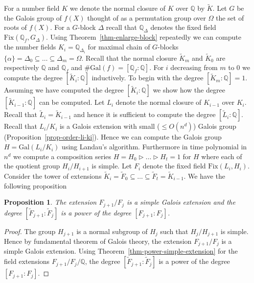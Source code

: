 \documentclass[11pt]{madras}%
\newtheorem{proposition}[theorem]{Proposition}
\theoremstyle{remark}
\newcommand{\Gal}[1]{{\ensuremath{\mathrm{Gal}\left(#1\right)}}}
\newcommand{\Fix}[2]{{\ensuremath{\mathrm{Fix}\left(#1,#2\right)}}}
\begin{document}
For a number field $K$ we denote the normal closure of $K$ over
$\mathbb{Q}$ by $\tilde{K}$. Let $G$ be the Galois group of $f(X)$
thought of as a permutation group over $\Omega$ the set of roots of
$f(X)$.  For a $G$-block $\Delta$ recall that $\mathbb{Q}_\Delta$
denotes the fixed field $\Fix{\mathbb{Q}_f}{G_\Delta}$. Using
Theorem~\ref{thm-enlarge-block} repeatedly we can compute the number
fields $K_i = \mathbb{Q}_{\Delta_i}$ for maximal chain of $G$-blocks
$\{\alpha \} = \Delta_0 \subseteq \ldots \subseteq \Delta_m = \Omega$.
Recall that the normal closure $\tilde{K}_m$ and $\tilde{K}_0$ are
respectively $\mathbb{Q}$ and $\mathbb{Q}_f$ and $\# \Gal{f} =
[\mathbb{Q}_f:\mathbb{Q}]$. For $i$ decreasing from $m$ to $0$ we
compute the degree $[\tilde{K}_i : \mathbb{Q}]$ inductively. To begin
with the degree $[\tilde{K}_m : \mathbb{Q}] = 1$. Assuming we have
computed the degree $[\tilde{K}_i : \mathbb{Q}]$ we show how the
degree $[\tilde{K}_{i-1} :\mathbb{Q}]$ can be computed.  Let $L_i$
denote the normal closure of $K_{i-1}$ over $K_i$. Recall that
$\tilde{L}_i = \tilde{K}_{i-1}$ and hence it is sufficient to compute
the degree $[\tilde{L}_i : \mathbb{Q}]$. Recall that $L_i/K_i$ is a
Galois extension with small ($\leq O(n^d)$) Galois group
(Proposition~\ref{prop-order-li-ki}). Hence we can compute the Galois
group $H = \Gal{L_i/K_i}$ using Landau's algorithm. Furthermore in
time polynomial in $n^d$ we compute a composition series $H = H_0 \rhd
\ldots \rhd H_t = 1$ for $H$ where each of the quotient group
$H_i/H_{i+1}$ is simple.  Let $F_i$ denote the fixed field
$\Fix{L_i}{H_i}$. Consider the tower of extensions $\tilde{K}_i =
\tilde{F}_0 \subseteq \ldots \subseteq \tilde{F}_t = \tilde{K}_{i-1}$.
We have the following proposition

\begin{proposition}\label{prop-fj}
  The extension $F_{j+1}/F_j$ is a simple Galois extension and the
  degree $[\tilde{F}_{j+1}: \tilde{F}_j]$ is a power of the degree
  $[F_{j+1}:F_j]$.
\end{proposition}
\begin{proof}
  The group $H_{j+1}$ is a normal subgroup of $H_j$ such that
  $H_j/H_{j+1}$ is simple. Hence by fundamental theorem of Galois
  theory, the extension $F_{j+1}/F_j$ is a simple Galois extension.
  Using Theorem~\ref{thm-power-simple-extension} for the field
  extensions $F_{j+1}/F_j/\mathbb{Q}$, the degree $[\tilde{F}_{j+1}:
  \tilde{F}_j]$ is a power of the degree $[F_{j+1}: F_j]$.
\end{proof}
\end{document}
